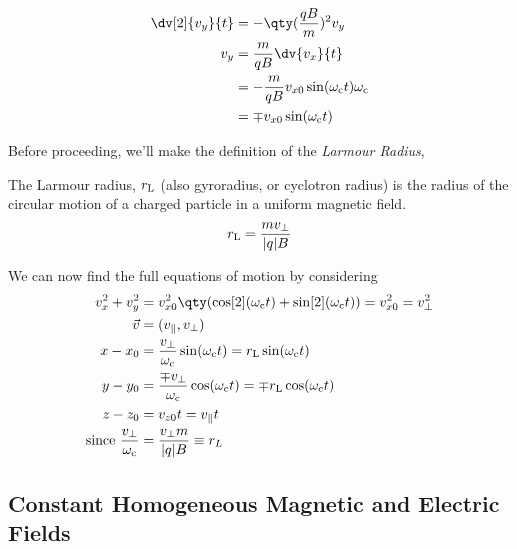 \documentclass{book}         		                %
\begin{document}
\begin{align*}
  \dv[2]{v_y}{t}                   & = - \qty(\frac{qB}{m})^2 v_y                                                                    \\
  v_y                              & = \frac{m}{qB} \dv{v_x}{t}                                                                      \\
                                   & = - \frac{m}{qB} v_{x0} \sin( \omega_{\rm c} t) \omega_{\rm c}                                  \\
                                   & = \mp v_{x0} \sin( \omega_{\rm c} t )                                                           \\
                     \end{align*}

Before proceeding, we'll make the definition of the \emph{Larmour Radius},
\begin{definition}
  The Larmour radius, $r_{\rm L}$ (also gyroradius, or cyclotron radius) is the
  radius of the circular motion of a charged particle in a uniform
  magnetic field.
\[ r_{\rm L} = \frac{m v_{\perp}}{|q|B} \]
\end{definition}

We can now find the full equations of motion by considering
\begin{subequations}
\begin{align}  \nonumber
                     v_x^2 + v_y^2 & = v_{x0}^2 \qty( \cos[2](\omega_{\rm c} t) + \sin[2]({\omega_{\rm c}t}) ) = v_{x0}^2 = v_{\perp}^2 \\ \nonumber
  \vec{v}                          & = (v_{\parallel}, v_{\perp})                                                              \\ 
  x - x_0                          & = \frac{v_{\perp}}{\omega_{\rm c}} \sin(\omega_{\rm c}t)     = r_{\rm L} \sin(\omega_{\rm c} t)  \\
  y - y_0                          & = \frac{\mp v_{\perp}}{\omega_{\rm c}} \cos(\omega_{\rm c}t)   =\mp r_{\rm L} \cos(\omega_{\rm c} t)  \\ 
  z - z_0 &= v_{z0} t = v_{\parallel} t \\
\nonumber
\text{since }  \frac{v_{\perp}}{\omega_{\rm c}}    & = \frac{v_{\perp}m}{|q|B} \equiv
  r_L
\end{align}
\end{subequations}

\subsection{Constant Homogeneous Magnetic and Electric Fields}
\label{sec:const-homog-magn-et-elec}
\end{document}
